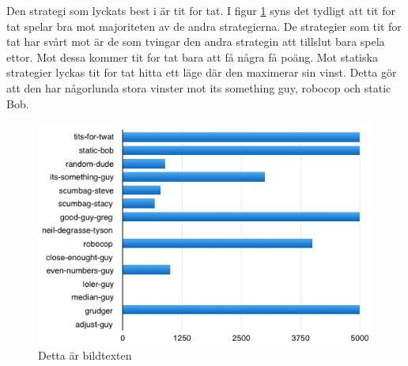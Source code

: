 Den strategi som lyckats best i är tit for tat. I figur \ref{tit-for-tat} syns det tydligt att tit for tat spelar bra mot majoriteten av de andra strategierna. De strategier som tit for tat har svårt mot är de som tvingar den andra strategin att tillslut bara spela ettor. Mot dessa kommer tit for tat bara att få några få poäng. Mot statiska strategier lyckas tit for tat hitta ett läge där den maximerar sin vinst. Detta gör att den har någorlunda stora vinster mot its something guy, robocop och static Bob.

\begin{figure}[H]
	\begin{center}
	\includegraphics[scale=0.75, angle=0]{bilder/tit-for-tat.png}
	\caption{Detta är bildtexten}
	\label{tit-for-tat}
	\end{center}
\end{figure}

